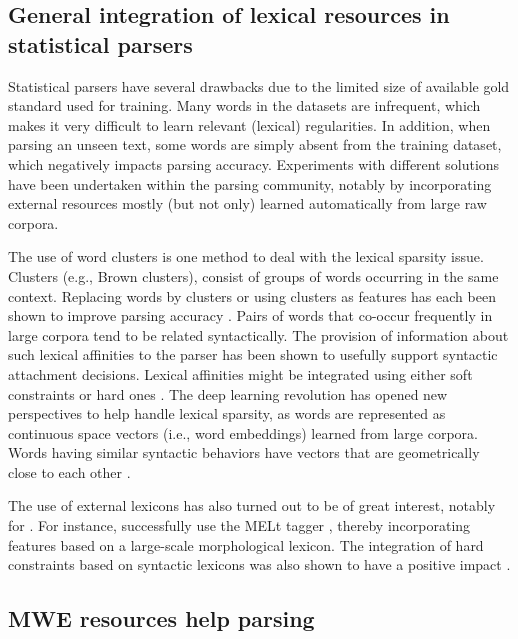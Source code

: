 \documentclass[output=paper]{langsci/langscibook}
\begin{document}
\subsection{General integration of lexical resources in statistical parsers}
\label{con:ssec:lexres-parse}

Statistical parsers have several drawbacks due to the limited size of available gold standard  used for training. Many words in the datasets are  infrequent, which makes it very difficult to learn relevant (lexical) regularities. In addition, when parsing an unseen text, some words are simply absent from  the training dataset, which negatively impacts parsing accuracy. Experiments with  different solutions have been undertaken within the parsing community, notably by incorporating external resources mostly (but not only) learned automatically from large raw corpora.

The use of word clusters is one method to deal with the lexical sparsity issue. Clusters (e.g., Brown clusters), consist of groups of words occurring in the same  context. 
Replacing words by clusters or using clusters as features has each been shown to improve parsing accuracy  \citep{koo-carreras-collins:2008:aclmain,candito-seddah:2010:spmrl}.
Pairs of words that co-occur frequently in large corpora tend to be related syntactically. 
The provision of information about such lexical affinities to the parser has been shown to usefully support  syntactic attachment decisions. 
Lexical affinities might be integrated using either soft constraints \citep{bansal:11,mirroshandel:12} or hard ones \citep{mirroshandel:2016}. 
The deep learning revolution has opened new perspectives to help handle lexical sparsity, as words are represented as continuous space vectors (i.e., word embeddings) learned from large corpora. Words having similar syntactic behaviors have vectors that are geometrically close to each other \citep{durrett:15,dyer:15}.

The use of external lexicons has also turned out to be of great interest, notably for . For instance, \citet{candito:2010} successfully use the MELt tagger \citep{denis:2012}, thereby incorporating features based on a large-scale morphological lexicon. The integration of hard constraints based on syntactic lexicons was also shown to have a positive impact \citep{mirroshandel:2013}. 


\subsection{MWE resources help parsing}
\label{con:ssec:mwe-help-parse}
\end{document}
